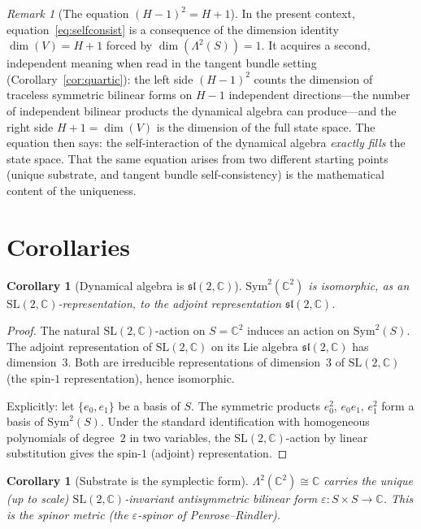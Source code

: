 \documentclass[11pt,a4paper]{article}
\newtheorem{corollary}[theorem]{Corollary}
\theoremstyle{definition}
\theoremstyle{remark}
\newtheorem{remark}[theorem]{Remark}
\newcommand{\C}{\mathbb{C}}
\newcommand{\Sym}{\mathrm{Sym}}
\newcommand{\SL}{\mathrm{SL}}
\begin{document}
\begin{remark}[The equation $(H-1)^2=H+1$]\label{rem:equation}
In the present context, equation~\eqref{eq:selfconsist} is a
consequence of the dimension identity $\dim(V)=H+1$ forced by
$\dim(\Lambda^2(S))=1$.
It acquires a second, independent meaning when read in the tangent
bundle setting (Corollary~\ref{cor:quartic}): the left side $(H-1)^2$
counts the dimension of traceless symmetric bilinear forms on $H-1$
independent directions---the number of independent bilinear products
the dynamical algebra can produce---and the right side $H+1=\dim(V)$ is
the dimension of the full state space.
The equation then says: the self-interaction of the dynamical algebra
\emph{exactly fills} the state space.
That the same equation arises from two different starting points
(unique substrate, and tangent bundle self-consistency) is the
mathematical content of the uniqueness.
\end{remark}

\section{Corollaries}\label{sec:corollaries}

\begin{corollary}[Dynamical algebra is $\mathfrak{sl}(2,\C)$]\label{cor:sl2}
$\Sym^2(\C^2)$ is isomorphic, as an $\SL(2,\C)$-representation, to the
adjoint representation $\mathfrak{sl}(2,\C)$.
\end{corollary}

\begin{proof}
The natural $\SL(2,\C)$-action on $S=\C^2$ induces an action on
$\Sym^2(S)$.
The adjoint representation of $\SL(2,\C)$ on its Lie algebra
$\mathfrak{sl}(2,\C)$ has dimension~$3$.
Both are irreducible representations of dimension~$3$ of $\SL(2,\C)$
(the spin-$1$ representation), hence isomorphic.

Explicitly: let $\{e_0,e_1\}$ be a basis of $S$.
The symmetric products $e_0^2,\,e_0 e_1,\,e_1^2$ form a basis of
$\Sym^2(S)$.
Under the standard identification with homogeneous polynomials of
degree~$2$ in two variables, the $\SL(2,\C)$-action by linear
substitution gives the spin-$1$ (adjoint) representation.
\end{proof}

\begin{corollary}[Substrate is the symplectic form]\label{cor:symplectic}
$\Lambda^2(\C^2)\cong\C$ carries the unique (up to scale)
$\SL(2,\C)$-invariant antisymmetric bilinear form
$\varepsilon\colon S\times S\to\C$.
This is the spinor metric (the $\varepsilon$-spinor of Penrose--Rindler).
\end{corollary}
\end{document}

